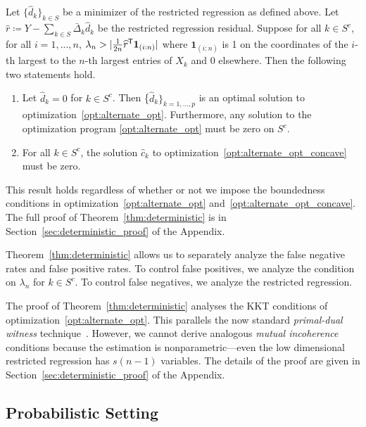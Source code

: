\begin{theorem}
\label{thm:deterministic}
Let $\{\hat{d}_k \}_{k \in S}$ be a minimizer of the restricted regression as defined above.
Let $\hat{r} \coloneqq Y - \sum_{k \in S} \bar{\Delta}_k \hat{d}_k$ be the restricted regression residual. 
Suppose for all $k\in S^c$, for all $i=1,...,n$, $\lambda_n > | \frac{1}{2n}
\widehat{r}^{\mathsf{T}} \mbox{\boldmath $1$}_{(i:n)}|$ where $\mathbf{1}_{(i:n)}$ is 1 on
the coordinates of the 
$i$-th largest to the $n$-th largest entries of $X_k$ and 0
elsewhere.  Then the following two statements hold.
\begin{enumerate}
\item Let $\hat{d}_k = 0$ for $k \in S^c$.  Then
  \{$\hat{d}_k\}_{k=1,...,p}$ is an optimal solution to
  optimization~\eqref{opt:alternate_opt}. Furthermore, any solution to
  the optimization program \eqref{opt:alternate_opt} must be zero on
  $S^c$.
\item For all $k \in S^c$, the solution $\hat{c}_k$ to optimization~\eqref{opt:alternate_opt_concave} must be zero.
\end{enumerate}

\end{theorem}

This result holds regardless of whether or not we impose the boundedness conditions in optimization~\eqref{opt:alternate_opt} and~\eqref{opt:alternate_opt_concave}.
The full proof of Theorem~\ref{thm:deterministic} is in Section~\ref{sec:deterministic_proof} of the Appendix.

Theorem~\ref{thm:deterministic} allows us to separately analyze the false negative
rates and false positive rates. To control false positives,
we analyze the condition on $\lambda_n$ for $k \in S^c$. To control
false negatives, we analyze the restricted regression. 

The proof of Theorem~\ref{thm:deterministic} analyses the KKT
conditions of optimization~\eqref{opt:alternate_opt}.  This parallels
the now standard \emph{primal-dual witness}
technique~\cite{wainwright2009sharp}. However, we cannot derive analogous
\emph{mutual incoherence} conditions because the estimation is
nonparametric---even the low dimensional restricted regression has
$s(n-1)$ variables. The details of the proof are given in
Section~\ref{sec:deterministic_proof} of the Appendix.

\subsection{Probabilistic Setting}

